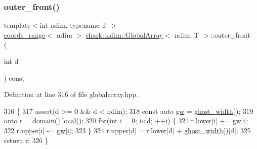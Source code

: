 \subsubsection{\texorpdfstring{outer\+\_\+front()}{outer\_front()}}
{\footnotesize\ttfamily template$<$int ndim, typename T $>$ \\
\hyperlink{structshark_1_1ndim_1_1coords__range}{coords\+\_\+range}$<$ ndim $>$ \hyperlink{classshark_1_1ndim_1_1_global_array}{shark\+::ndim\+::\+Global\+Array}$<$ ndim, T $>$\+::outer\+\_\+front (\begin{DoxyParamCaption}\item[{int}]{d }\end{DoxyParamCaption}) const\hspace{0.3cm}{\ttfamily [inline]}}



Definition at line 316 of file globalarray.\+hpp.


\begin{DoxyCode}
316                                                                               \{
317                         assert(d >= 0 && d < ndim);
318                         \textcolor{keyword}{const} \textcolor{keyword}{auto} \hyperlink{classshark_1_1ndim_1_1_global_array_a38d93d114d585e5e5491c5ecd35c6bfc}{gw} = \hyperlink{classshark_1_1ndim_1_1_global_array_a5331f21887f3c14791b758e99656a676}{ghost\_width}();
319             \textcolor{keyword}{auto} r = \hyperlink{classshark_1_1ndim_1_1_global_array_a435ee8ff23c3feadf2ef2be64d4f375c}{domain}().local();
320                         \textcolor{keywordflow}{for}(\textcolor{keywordtype}{int} i = 0; i<d; ++i) \{ 
321                             r.lower[i] += \hyperlink{classshark_1_1ndim_1_1_global_array_a38d93d114d585e5e5491c5ecd35c6bfc}{gw}[i];
322                             r.upper[i] -= \hyperlink{classshark_1_1ndim_1_1_global_array_a38d93d114d585e5e5491c5ecd35c6bfc}{gw}[i];
323                         \}
324                         r.upper[d] = r.lower[d] + \hyperlink{classshark_1_1ndim_1_1_global_array_a5331f21887f3c14791b758e99656a676}{ghost\_width}()[d];
325                         \textcolor{keywordflow}{return} r;
326         \}
\end{DoxyCode}
\hypertarget{classshark_1_1ndim_1_1_global_array_a31a8a5247cc8adbe0602a83de759d915}{}\label{classshark_1_1ndim_1_1_global_array_a31a8a5247cc8adbe0602a83de759d915} 
